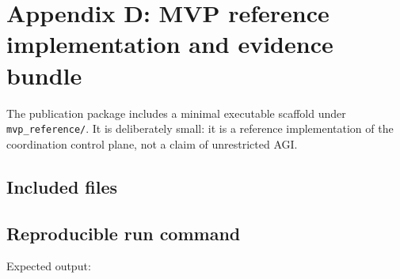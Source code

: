 \section{Appendix D: MVP reference implementation and evidence
bundle}\label{appendix-d-mvp-reference-implementation-and-evidence-bundle}

The publication package includes a minimal executable scaffold under
\texttt{mvp\_reference/}. It is deliberately small: it is a reference
implementation of the coordination control plane, not a claim of
unrestricted AGI.

\subsection{Included files}\label{included-files}

\begin{Shaded}
\begin{Highlighting}[]
\end{Highlighting}
\end{Shaded}

\subsection{Reproducible run command}\label{reproducible-run-command}

\begin{Shaded}
\begin{Highlighting}[]
\end{Highlighting}
\end{Shaded}

Expected output:

\begin{Shaded}
\begin{Highlighting}[]
\FunctionTok{\{}
  \FunctionTok{:} \FunctionTok{,}
  \FunctionTok{:} \FunctionTok{,}
  \FunctionTok{:} \OtherTok{[}\OtherTok{,} \OtherTok{,} \OtherTok{,} \OtherTok{]}
\FunctionTok{\}}
\end{Highlighting}
\end{Shaded}

